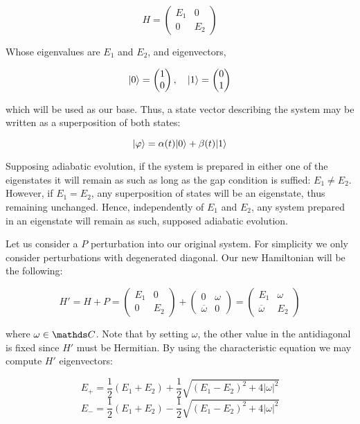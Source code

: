 $$
	H = 
	\begin{pmatrix}
		E_1 & 0 \\
		0 & E_2 
	\end{pmatrix}
$$

Whose eigenvalues are $E_1$ and $E_2$, and eigenvectors,

$$
	|0\rangle = 
	\begin{pmatrix}
	1 \\
	0 
	\end{pmatrix}, \quad
	|1\rangle = 
	\begin{pmatrix}
	0 \\
	1 
	\end{pmatrix}
$$

which will be used as our base. Thus, a state vector describing the system may be written as a superposition of both states:

$$ |\varphi\rangle = \alpha(t)|0\rangle + \beta(t)|1\rangle $$

Supposing adiabatic evolution, if the system is prepared in either one of the eigenstates it will remain as such as long as the gap condition is suffied: $E_1 \neq E_2$. However, if $E_1 = E_2$, any superposition of states will be an eigenstate, thus remaining unchanged. Hence, independently of $E_1$ and $E_2$, any system prepared in an eigenstate will remain as such, supposed adiabatic evolution.

Let us consider a $P$ perturbation into our original system. For simplicity we only consider perturbations with degenerated diagonal. Our new Hamiltonian will be the following:

$$
	H' = H + P =
	\begin{pmatrix}
	E_1 & 0 \\
	0 & E_2 
	\end{pmatrix} +
	\begin{pmatrix}
	0 & \omega \\
	\overline \omega & 0 
	\end{pmatrix} = 
	\begin{pmatrix}
	E_1 & \omega \\
	\overline \omega & E_2 
	\end{pmatrix}
$$

where $\omega \in \C$. Note that by setting $\omega$, the other value in the antidiagonal is fixed since $H'$ must be Hermitian. By using the characteristic equation we may compute $H'$ eigenvectors:

$$ E_+ = \frac{1}{2}(E_1 + E_2) + \frac{1}{2}\sqrt{(E_1 - E_2)^2 + 4|\omega|^2} $$
$$ E_- = \frac{1}{2}(E_1 + E_2) - \frac{1}{2}\sqrt{(E_1 - E_2)^2 + 4|\omega|^2} $$

